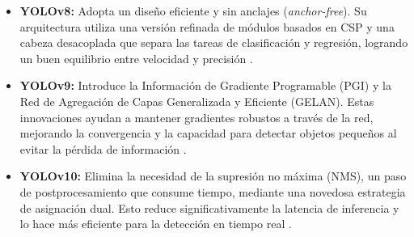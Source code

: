 \documentclass[12pt,a4paper,onecolumn,oneside]{report}
\begin{document}
\begin{itemize}
  \item \textbf{YOLOv8:} Adopta un diseño eficiente y sin anclajes (\textit{anchor-free}). Su arquitectura utiliza una versión refinada de módulos basados en CSP y una cabeza desacoplada que separa las tareas de clasificación y regresión, logrando un buen equilibrio entre velocidad y precisión \cite{defyolos}.
  \item \textbf{YOLOv9:} Introduce la Información de Gradiente Programable (PGI) y la Red de Agregación de Capas Generalizada y Eficiente (GELAN). Estas innovaciones ayudan a mantener gradientes robustos a través de la red, mejorando la convergencia y la capacidad para detectar objetos pequeños al evitar la pérdida de información \cite{defyolos}.
  \item \textbf{YOLOv10:} Elimina la necesidad de la supresión no máxima (NMS), un paso de postprocesamiento que consume tiempo, mediante una novedosa estrategia de asignación dual. Esto reduce significativamente la latencia de inferencia y lo hace más eficiente para la detección en tiempo real \cite{defyolos}.
\end{itemize}
\end{document}
